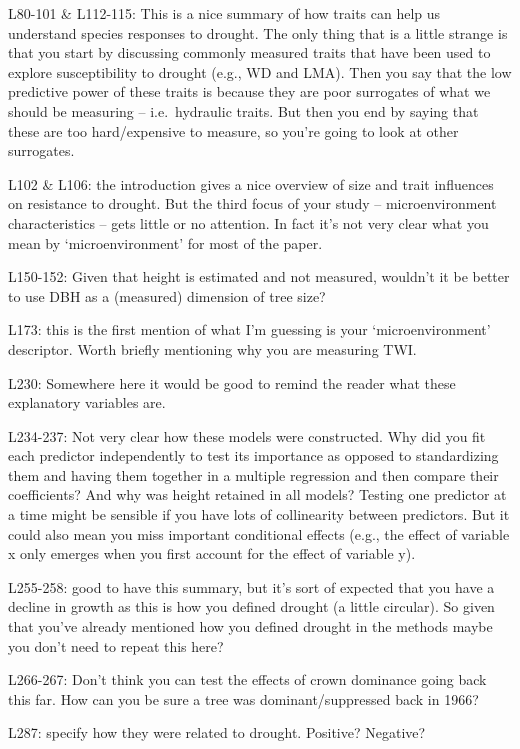 \documentclass[
]{article}
\begin{document}
L80-101 \& L112-115: This is a nice summary of how traits can help us
understand species responses to drought. The only thing that is a little
strange is that you start by discussing commonly measured traits that
have been used to explore susceptibility to drought (e.g., WD and LMA).
Then you say that the low predictive power of these traits is because
they are poor surrogates of what we should be measuring --
i.e.~hydraulic traits. But then you end by saying that these are too
hard/expensive to measure, so you're going to look at other surrogates.

L102 \& L106: the introduction gives a nice overview of size and trait
influences on resistance to drought. But the third focus of your study
-- microenvironment characteristics -- gets little or no attention. In
fact it's not very clear what you mean by `microenvironment' for most of
the paper.

L150-152: Given that height is estimated and not measured, wouldn't it
be better to use DBH as a (measured) dimension of tree size?

L173: this is the first mention of what I'm guessing is your
`microenvironment' descriptor. Worth briefly mentioning why you are
measuring TWI.

L230: Somewhere here it would be good to remind the reader what these
explanatory variables are.

L234-237: Not very clear how these models were constructed. Why did you
fit each predictor independently to test its importance as opposed to
standardizing them and having them together in a multiple regression and
then compare their coefficients? And why was height retained in all
models? Testing one predictor at a time might be sensible if you have
lots of collinearity between predictors. But it could also mean you miss
important conditional effects (e.g., the effect of variable x only
emerges when you first account for the effect of variable y).

L255-258: good to have this summary, but it's sort of expected that you
have a decline in growth as this is how you defined drought (a little
circular). So given that you've already mentioned how you defined
drought in the methods maybe you don't need to repeat this here?

L266-267: Don't think you can test the effects of crown dominance going
back this far. How can you be sure a tree was dominant/suppressed back
in 1966?

L287: specify how they were related to drought. Positive? Negative?
\end{document}
